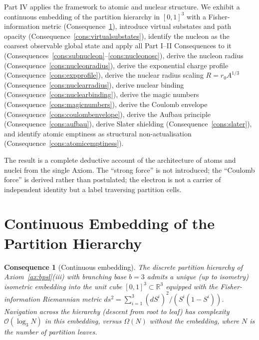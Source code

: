 \documentclass[11pt,twocolumn,a4paper]{article}
\theoremstyle{axiomstyle}
\theoremstyle{conseqstyle}
\newtheorem{consequence}{Consequence}
\theoremstyle{definition}
\theoremstyle{remark}
\newcommand{\Real}{\mathbb{R}}
\begin{document}
Part IV applies the framework to atomic and nuclear structure. We exhibit a continuous embedding of the partition hierarchy in $[0,1]^{3}$ with a Fisher-information metric (Consequence~\ref{cons:continuousembed}), introduce virtual substates and path opacity (Consequence~\ref{cons:virtualsubstates}), identify the nucleon as the coarsest observable global state and apply all Part I--II Consequences to it (Consequences~\ref{cons:subnucleon}--\ref{cons:nucleonosc}), derive the nucleon radius (Consequence~\ref{cons:nucleonradius}), derive the exponential charge profile (Consequence~\ref{cons:expprofile}), derive the nuclear radius scaling $R=r_{0}A^{1/3}$ (Consequence~\ref{cons:nuclearradius}), derive nuclear binding (Consequence~\ref{cons:nuclearbinding}), derive the magic numbers (Consequence~\ref{cons:magicnumbers}), derive the Coulomb envelope (Consequence~\ref{cons:coulombenvelope}), derive the Aufbau principle (Consequence~\ref{cons:aufbau}), derive Slater shielding (Consequence~\ref{cons:slater}), and identify atomic emptiness as structural non-actualisation (Consequence~\ref{cons:atomicemptiness}).

The result is a complete deductive account of the architecture of atoms and nuclei from the single Axiom. The ``strong force'' is not introduced; the ``Coulomb force'' is derived rather than postulated; the electron is not a carrier of independent identity but a label traversing partition cells.

\section{Continuous Embedding of the Partition Hierarchy}
\label{sec:continuousemb}

\begin{consequence}[Continuous embedding]
\label{cons:continuousembed}
The discrete partition hierarchy of Axiom~\ref{ax:bpsl}(iii) with branching base $b=3$ admits a unique (up to isometry) isometric embedding into the unit cube $[0,1]^{3}\subset\Real^{3}$ equipped with the Fisher-information Riemannian metric $ds^{2}=\sum_{i=1}^{3}(dS^{i})^{2}/(S^{i}(1-S^{i}))$. Navigation across the hierarchy (descent from root to leaf) has complexity $\mathcal{O}(\log_{3}N)$ in this embedding, versus $\Omega(N)$ without the embedding, where $N$ is the number of partition leaves.
\end{consequence}
\end{document}
